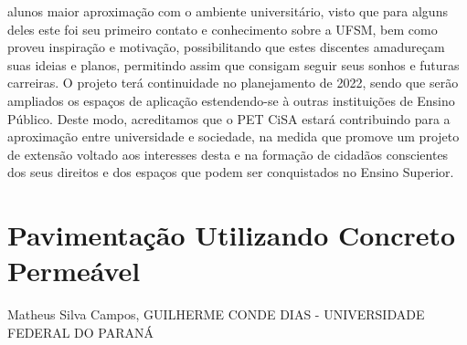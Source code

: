 alunos maior aproximação com o ambiente universitário, visto que para alguns deles este foi seu 
primeiro contato e conhecimento sobre a UFSM, bem como proveu inspiração e motivação, 
possibilitando que estes discentes amadureçam suas ideias e planos, permitindo assim que 
consigam seguir seus sonhos e futuras carreiras. O projeto terá continuidade no planejamento de 
2022, sendo que serão ampliados os espaços de aplicação estendendo-se à outras instituições de 
Ensino Público. Deste modo, acreditamos que o PET CiSA estará contribuindo para a aproximação 
entre universidade e sociedade, na medida que promove um projeto de extensão voltado aos 
interesses desta e na formação de cidadãos conscientes dos seus direitos e dos espaços que podem 
ser conquistados no Ensino Superior.




\section*{Pavimentação Utilizando Concreto Permeável}

Matheus Silva Campos, GUILHERME CONDE DIAS - UNIVERSIDADE FEDERAL DO PARANÁ

